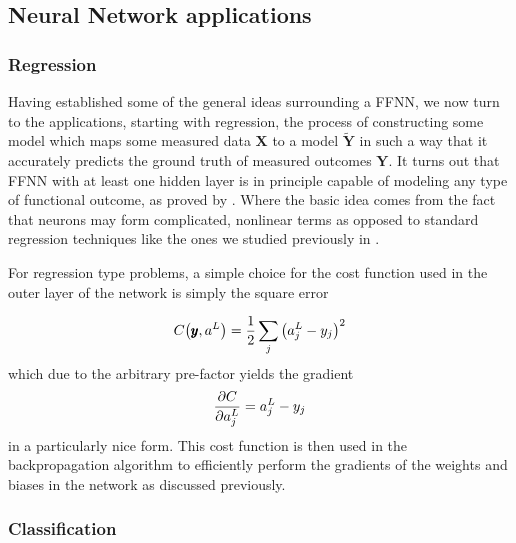 \documentclass[reprint, english, nofootinbib]{revtex4-2}
\begin{document}
\subsection{Neural Network applications}
\subsubsection{Regression}
\noindent
Having established some of the general ideas surrounding a FFNN, we now turn to the applications, starting with regression, the process of constructing some model which maps some measured data $\pmb X$ to a model $\tilde{\pmb Y}$ in such a way that it accurately predicts the ground truth of measured outcomes $\pmb Y$. It turns out that FFNN with at least one hidden layer is in principle capable of modeling any type of functional outcome, as proved by \textcite{HORNIK1989359}. Where the basic idea comes from the fact that neurons may form complicated, nonlinear terms as opposed to standard regression techniques like the ones we studied previously in \cite{4155_project_1}.

For regression type problems, a simple choice for the cost function used in the outer layer of the network is simply the square error \cite{Nielsen}

\begin{equation}
    C\qty(\pmb y, a^L) = \frac{1}{2}\sum_j \qty(a^L_j - y_j)^2
\end{equation}
which due to the arbitrary pre-factor yields the gradient
\begin{equation}
    \pdv{C}{a^L_j} = a^L_j - y_j
\end{equation}
in a particularly nice form. This cost function is then used in the backpropagation algorithm to efficiently perform the gradients of the weights and biases in the network as discussed previously.
\subsubsection{Classification}
\end{document}
